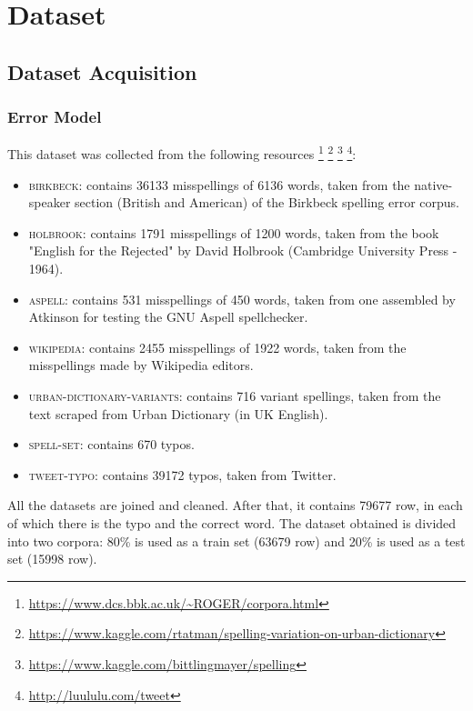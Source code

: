 \chapter{Dataset}

\section{Dataset Acquisition}
\label{section:dataset-exploration}
\subsection{Error Model}
This dataset was collected from the following resources 
\footnote{\url{https://www.dcs.bbk.ac.uk/~ROGER/corpora.html}}  
\footnote{\url{https://www.kaggle.com/rtatman/spelling-variation-on-urban-dictionary}}  
\footnote{\url{https://www.kaggle.com/bittlingmayer/spelling}}
\footnote{\url{http://luululu.com/tweet}}:
\begin{itemize}
	\item \textsc{birkbeck}: contains \num{36133} misspellings of \num{6136} words, taken from the native-speaker 
	section (British and American) of the Birkbeck spelling error corpus.
	\item \textsc{holbrook}: contains \num{1791} misspellings of \num{1200} words, taken from the book "English for the 
	Rejected" by 
	David Holbrook (Cambridge University Press - 1964).
	\item \textsc{aspell}: contains \num{531} misspellings of \num{450} words, taken from one assembled by Atkinson for 
	testing the 
	GNU Aspell spellchecker.
	\item \textsc{wikipedia}: contains \num{2455} misspellings of \num{1922} words, taken from the misspellings made by 
	Wikipedia 
	editors.
	\item \textsc{urban-dictionary-variants}: contains \num{716} variant spellings, taken from the text scraped from Urban 
	Dictionary (in UK English).
	\item \textsc{spell-set}: contains \num{670} typos.
	\item \textsc{tweet-typo}: contains \num{39172} typos, taken from Twitter.
\end{itemize}

All the datasets are joined and cleaned. After that, it contains \num{79677} row, in each of which there 
is the typo and the correct word.
The dataset obtained is divided into two corpora: \num{80}\% is used as a train set (\num{63679} row) and \num{20}\% is 
used as a test set (\num{15998} row).

